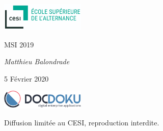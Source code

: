 \documentclass[a4paper, 11pt]{report}
\title{\Huge \color{burntorange}{Valorisation de l'open source en tant qu'éditeur}}
\author{\Large Matthieu \bsc{Balondrade} \\MSI 2019 }
\date{\Large 5 Février 2020}
\newcommand\blankpage{%
    \null
    \thispagestyle{empty}%
    \addtocounter{page}{-1}%
    \newpage}
\begin{document}
\begin{titlepage}
	\centering
	\includegraphics[width=0.3\textwidth]{./img/cesi.png}\par\vspace{1cm}
	{\scshape\Large MSI 2019\par}
	\vspace{3cm}
	{\huge\bfseries \color{burntorange}{Valorisation de l'open source en tant qu'éditeur}\par}
	\vspace{2cm}
	{\Large\itshape Matthieu Balondrade\par}\vspace{2cm}
	{\large 5 Février 2020\par}
	\vfill

	\includegraphics[width=0.3\textwidth]{./img/docdoku.png}\par\vspace{2cm}\par

	Diffusion limitée au CESI, reproduction interdite.\par


\end{titlepage}
\afterpage{\blankpage}
\tableofcontents
\listoffigures
\printnoidxglossaries
\printglossary[type=\acronymtype]











\end{document}
